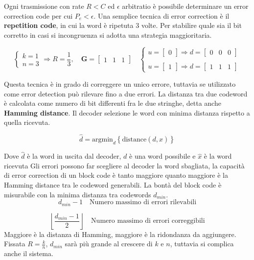 Ogni trasmissione con rate $R < C$ ed $\epsilon$ arbitratio è possibile determinare un error correction code per cui $P_e < \epsilon$.
Una semplice tecnica di error correction è il \textbf{repetition code}, in cui la word è ripetuta 3 volte. Per stabilire quale sia il bit corretto in casi si incongruenza si adotta una strategia maggioritaria.


\[
    \begin{cases}
        k = 1 \\
        n = 3 
    \end{cases}
    \Rightarrow R = \frac{1}{3},
    \quad \mathbf{G} =
    \begin{bmatrix}
        1 & 1 & 1
    \end{bmatrix}
    \quad 
    \begin{cases}
        u = \begin{bmatrix}0\end{bmatrix} \Rightarrow d = \begin{bmatrix}0 & 0 & 0\end{bmatrix} \\
        \\
        u = \begin{bmatrix}1\end{bmatrix} \Rightarrow d = \begin{bmatrix}1 & 1 & 1\end{bmatrix}
    \end{cases}
\]


Questa tecnica è in grado di correggere un unico errore, tuttavia se utilizzato come error detection può rilevare fino a due errori.
La distanza tra due codeword è calcolata come numero di bit differenti fra le due stringhe, detta anche \textbf{Hamming distance}. Il decoder selezione le word con minima distanza rispetto a quella ricevuta.

\[
    \hat{d} = \text{argmin}_d \left\{\text{distance}(d, \hat{x})\right\}
\]

Dove $\hat{d}$ è la word in uscita dal decoder, $d$ è una word possibile e $\hat{x}$ è la word ricevuta
Gli errori possono far scegliere al decoder la word sbagliata, la capacità di error correction di un block code è tanto maggiore quanto maggiore è la Hamming distance tra le codeword generabili. La bontà del block code è misurabile con la minima distanza tra codewords $d_{min}$.
\[
    d_{min} - 1 \quad \text{Numero massimo di errori rilevabili}
\]

\[
    \left\lfloor \frac{d_{min} - 1}{2} \right\rfloor \quad \text{Numero massimo di errori correggibili}
\]
Maggiore è la distanza di Hamming, maggiore è la ridondanza da aggiungere.
Fissata $R=\frac{k}{n}$, $d_{min}$ sarà più grande al crescere di $k$ e $n$, tuttavia si complica anche il sistema.
